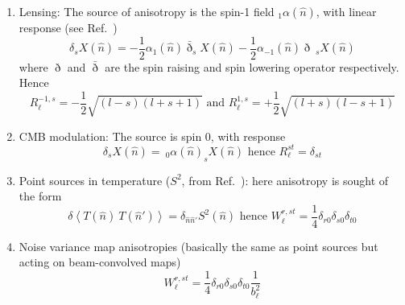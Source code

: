 \documentclass{article}
\newcommand{\av}[1]{\left\langle #1 \right\rangle}
\newcommand{\hn}[0]{\hat n}
\begin{document}
\begin{enumerate}
	\item Lensing: The source of anisotropy is the spin-1 field $_1\alpha(\hn)$, with linear response (see Ref.~\cite{Challinor:2002cd})
	\begin{equation}
		\delta _sX(\hn) =  -\frac 12 \alpha_1(\hn) \bar \eth _{s}X(\hn) - \frac 12 \alpha_{-1}(\hn) \eth \:_sX(\hn) 
	\end{equation}
	where $\eth$ and $\bar \eth$ are the spin raising and spin lowering operator respectively. Hence
	\begin{equation}
		R_\ell^{-1, s} =- \frac 12\sqrt{ (l - s) (l + s + 1) } \textrm{  and   }R_\ell^{1, s} = +\frac12\sqrt{ (l + s) (l - s + 1) }
	\end{equation}
	\item CMB modulation: The source is spin 0, with response
	\begin{equation}
	\delta _sX(\hn) = \:_0\alpha(\hn) _{s}X(\hn)	
	\textrm{   hence   } R_\ell^{st} = \delta_{st}
	\end{equation}
	\item Point sources in temperature ($S^2$, from Ref.~\cite{Osborne:2013nna}): here anisotropy is sought of the form
	\begin{equation}
	\delta  \av{T(\hn) \:T(\hn')} = \delta_{\hat n\hat n'}S^2(\hn)\textrm{    hence     }
	W^{r, st}_\ell = \frac 14\delta_{r0}\delta_{s0}\delta_{t0} 
	\end{equation}
	\item Noise variance map anisotropies (basically the same as point sources but acting on beam-convolved maps)	\begin{equation}
	W^{r, st}_\ell = \frac 14\delta_{r0}\delta_{s0}\delta_{t0}  \frac{1}{b_\ell^2}
	\end{equation}
\end{enumerate}
\end{document}

